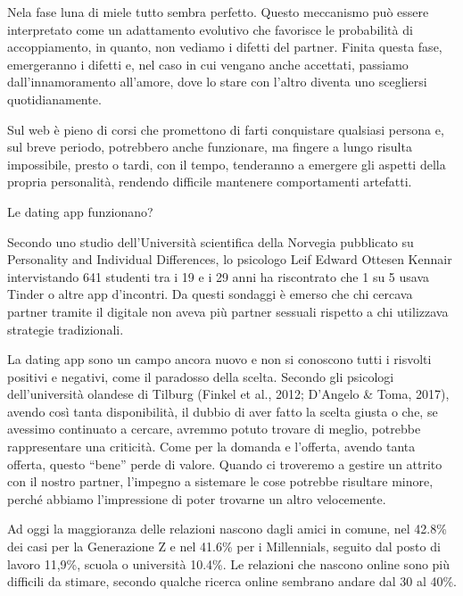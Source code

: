 \documentclass[12pt]{book} %
\begin{document}
Nela fase luna di miele tutto sembra perfetto. Questo meccanismo può essere interpretato come un adattamento evolutivo che favorisce le probabilità di accoppiamento, in quanto, non vediamo i difetti del partner. Finita questa fase, emergeranno i difetti e, nel caso in cui vengano anche accettati, passiamo dall'innamoramento all'amore, dove lo stare con l'altro diventa uno scegliersi quotidianamente.

Sul web è pieno di corsi che promettono di farti conquistare qualsiasi persona e, sul breve periodo, potrebbero anche funzionare, ma fingere a lungo risulta impossibile, presto o tardi, con il tempo, tenderanno a emergere gli aspetti della propria personalità, rendendo difficile mantenere comportamenti artefatti.

\begin{mdframed}[linewidth=1pt]
Le dating app funzionano?

Secondo uno studio dell'Università scientifica della Norvegia pubblicato su Personality and Individual Differences, lo psicologo Leif Edward Ottesen Kennair intervistando 641 studenti tra i 19 e i 29 anni ha riscontrato che 1 su 5 usava Tinder o altre app d'incontri. Da questi sondaggi è emerso che chi cercava partner tramite il digitale non aveva più partner sessuali rispetto a chi utilizzava strategie tradizionali. 

La dating app sono un campo ancora nuovo e non si conoscono tutti i risvolti positivi e negativi, come il paradosso della scelta. Secondo gli psicologi dell'università olandese di Tilburg (Finkel et al., 2012; D’Angelo \& Toma, 2017), avendo così tanta disponibilità, il dubbio di aver fatto la scelta giusta o che, se avessimo continuato a cercare, avremmo potuto trovare di meglio, potrebbe rappresentare una criticità. Come per la domanda e l'offerta, avendo tanta offerta, questo “bene” perde di valore. Quando ci troveremo a gestire un attrito con il nostro partner, l'impegno a sistemare le cose potrebbe risultare minore, perché abbiamo l'impressione di poter trovarne un altro velocemente.

Ad oggi la maggioranza delle relazioni nascono dagli amici in comune, nel 42.8\% dei casi per la Generazione Z e nel 41.6\% per i Millennials, seguito dal posto di lavoro 11,9\%, scuola o università 10.4\%. Le relazioni che nascono online sono più difficili da stimare, secondo qualche ricerca online sembrano andare dal 30 al 40\%.
\end{mdframed}
\end{document}
